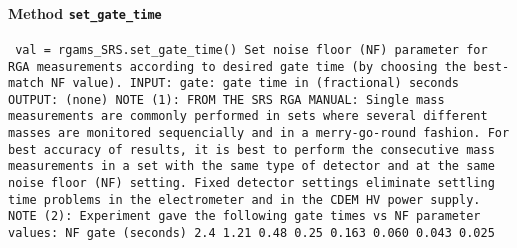 \paragraph{Method \texttt{set_gate_time}}
\vspace{1ex}
\texttt{\newline
val = rgams_SRS.set_gate_time()\newline
\newline
Set noise floor (NF) parameter for RGA measurements according to desired gate time (by choosing the best-match NF value).\newline
\newline
INPUT:\newline
gate: gate time in (fractional) seconds\newline
\newline
OUTPUT:\newline
(none)\newline
\newline
NOTE (1):\newline
FROM THE SRS RGA MANUAL:\newline
Single mass measurements are commonly performed in sets\newline
where several different masses are monitored sequencially\newline
and in a merry-go-round fashion.\newline
For best accuracy of results, it is best to perform the consecutive\newline
mass measurements in a set with the same type of detector\newline
and at the same noise floor (NF) setting.\newline
Fixed detector settings eliminate settling time problems\newline
in the electrometer and in the CDEM HV power supply.\newline
\newline
NOTE (2):\newline
Experiment gave the following gate times vs NF parameter values:\newline
\newline
NF	gate (seconds)	2.4	  	1.21	  	0.48	  	0.25	  	0.163 	0.060 	0.043 	0.025 \newline
\newline
}

